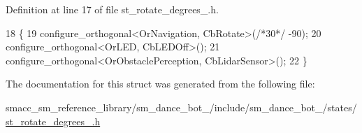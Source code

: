 Definition at line 17 of file st\+\_\+rotate\+\_\+degrees\+\_.\+h.


\begin{DoxyCode}
18   \{
19     configure\_orthogonal<OrNavigation, CbRotate>(\textcolor{comment}{/*30*/} -90);
20     configure\_orthogonal<OrLED, CbLEDOff>();
21     configure\_orthogonal<OrObstaclePerception, CbLidarSensor>();
22   \}
\end{DoxyCode}


The documentation for this struct was generated from the following file\+:\begin{DoxyCompactItemize}
\item 
smacc\+\_\+sm\+\_\+reference\+\_\+library/sm\+\_\+dance\+\_\+bot\+\_/include/sm\+\_\+dance\+\_\+bot\+\_/states/\hyperlink{3_2include_2sm__dance__bot__3_2states_2st__rotate__degrees__2_8h}{st\+\_\+rotate\+\_\+degrees\+\_.\+h}\end{DoxyCompactItemize}
